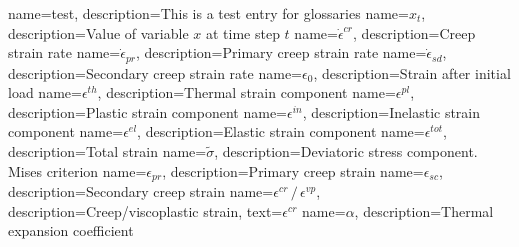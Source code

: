
{
	name={test},
	description={This is a test entry for glossaries}
}
{
	name={\ensuremath{x_t}},
	description={Value of variable $x$ at time step \ensuremath{t}}
}
{
	name={\ensuremath{\dot{\epsilon}^{cr}}},
	description={Creep strain rate}
}
{
	name={\ensuremath{\dot{\epsilon}_{pr}}},
	description={Primary creep strain rate}
}
{
	name={\ensuremath{\dot{\epsilon}_{sd}}},
	description={Secondary creep strain rate}
}
{
	name={\ensuremath{\epsilon_{0}}},
	description={Strain after initial load}
}
{
	name={\ensuremath{\epsilon^{th}}},
	description={Thermal strain component}
}
{
	name={\ensuremath{\epsilon^{pl}}},
	description={Plastic strain component}
}
{
	name={\ensuremath{\epsilon^{in}}},
	description={Inelastic strain component}
}
{
	name={\ensuremath{\epsilon^{el}}},
	description={Elastic strain component}
}
{
	name={\ensuremath{\epsilon^{tot}}},
	description={Total strain}
}
{
	name={\ensuremath{\tilde{\sigma}}},
	description={Deviatoric stress component. Mises criterion}
}
{
	name={\ensuremath{\epsilon_{pr}}},
	description={Primary creep strain}
}
{
	name={\ensuremath{\epsilon_{sc}}},
	description={Secondary creep strain}
}
{
	name={\ensuremath{\epsilon^{cr}\, / \, \epsilon^{vp}}},
	description={Creep/viscoplastic strain},
	text={\ensuremath{\epsilon^{cr}}}
}
{
	name={\ensuremath{\alpha}},
	description={Thermal expansion coefficient}
}
